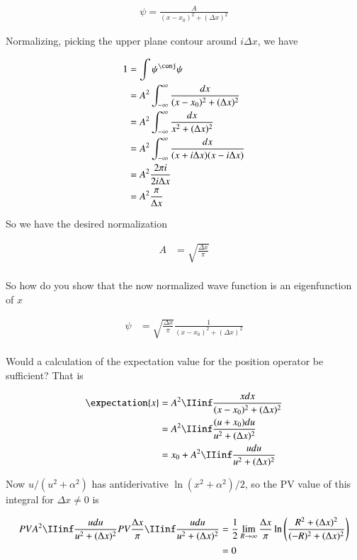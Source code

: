 \begin{align*}
\psi = \frac{A}{(x-x_0)^2 + (\Delta x)^2}
\end{align*}

Normalizing, picking the upper plane contour around $i \Delta x$, we have

\begin{align*}
1 &= \int \psi^\conj \psi \\
&= A^2 \int_{-\infty}^\infty \frac{dx}{(x-x_0)^2 + (\Delta x)^2} \\
&= A^2 \int_{-\infty}^\infty \frac{dx}{x^2 + (\Delta x)^2} \\
&= A^2 \int_{-\infty}^\infty \frac{dx}{(x + i\Delta x)(x - i \Delta x)} \\
&= A^2 \frac{2 \pi i }{2 i\Delta x} \\
&= A^2 \frac{\pi}{\Delta x} \\
\end{align*}

So we have the desired normalization

\begin{align*}
A &= \sqrt{\frac{\Delta x}{\pi}} \\
\end{align*}

So how do you show that the now normalized wave function is an eigenfunction of $x$ 

\begin{align*}
\psi &= \sqrt{\frac{\Delta x}{\pi}} \frac{1}{(x-x_0)^2 + (\Delta x)^2} \\
\end{align*}

Would a calculation of the expectation value for the position operator be sufficient?  That is

\begin{align*}
\expectation{x} 
&= A^2 \IIinf \frac{x dx }{(x-x_0)^2 + (\Delta x)^2} \\
&= A^2 \IIinf \frac{(u + x_0) du }{u^2 + (\Delta x)^2} \\
&= x_0 + A^2 \IIinf \frac{u du }{u^2 + (\Delta x)^2} \\
\end{align*}

Now $u/(u^2 + \alpha^2)$ has antiderivative $\ln(x^2 + \alpha^2)/2$, so the PV value of this integral for $\Delta x \ne 0$
is

\begin{align*}
PV A^2 \IIinf \frac{u du }{u^2 + (\Delta x)^2} 
PV \frac{\Delta x}{\pi} \IIinf \frac{u du }{u^2 + (\Delta x)^2} 
&= \inv{2} \lim_{R\rightarrow \infty} \frac{\Delta x}{\pi} \ln\left( \frac{R^2 + (\Delta x)^2}{(-R)^2 + (\Delta x)^2} \right) \\
&= 0
\end{align*}

